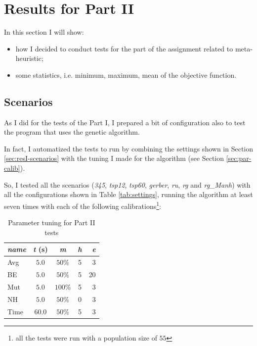 \section{Results for Part II}

In this section I will show:
\begin{itemize}
  \item how I decided to conduct tests for the part of the assignment related
    to meta-heuristic;
  \item some statistics, i.e. minimum, maximum, mean of the objective function.
\end{itemize}

\subsection{Scenarios}

As I did for the tests of the Part I, I prepared a bit of configuration also
to test the program that uses the genetic algorithm.

In fact, I automatized the tests to run by combining the settings shown in
Section \ref{sec:resI-scenarios} with the tuning I made for the algorithm (see
Section \ref{sec:par-calib}).

So, I tested all the scenarios (\textit{345}, \textit{tsp12}, \textit{tsp60},
\textit{gerber}, \textit{ru}, \textit{rg} and \textit{rg\_Manh}) with all the
configurations shown in Table \ref{tab:settings}, running the algorithm at
least seven times with each of the following calibrations\footnote{all the
tests were run with a population size of $55$}:

\begin{table}[H]
  \centering
  \begin{tabular}{|l|c|c|c|r|}
    \hline
    \textbf{\textit{name}} & \textbf{\textit{t}} (s) & \textbf{\textit{m}} &
    \textbf{\textit{h}} & \textbf{\textit{e}} \\
    \hline
    \hline
    Avg & $5.0$ & $50\%$ & 5 & 3 \\
    \hline
    BE & $5.0$ & $50\%$ & 5 & 20 \\
    \hline
    Mut & $5.0$ & $100\%$ & 5 & 3 \\
    \hline
    NH & $5.0$ & $50\%$ & 0 & 3 \\
    \hline
    Time & $60.0$ & $50\%$ & 5 & 3 \\
    \hline
  \end{tabular}
  \caption{Parameter tuning for Part II tests}
  \label{tab:tuning}
\end{table}

